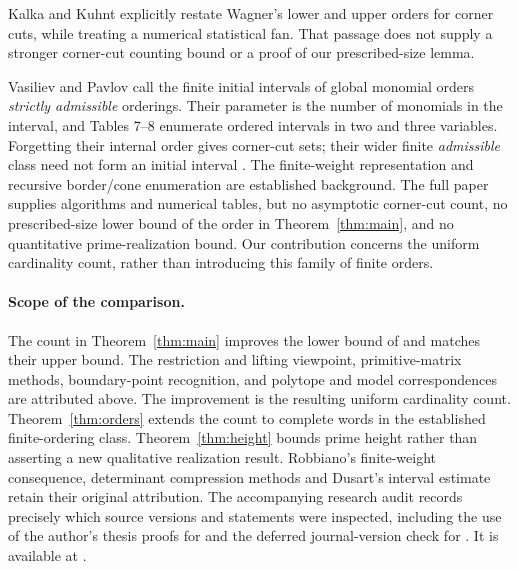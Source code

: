 \documentclass[11pt,a4paper]{article}
\theoremstyle{remark}
\begin{document}
Kalka and Kuhnt \cite[Section 2.2, p.~6]{KK} explicitly restate
Wagner's lower and upper orders for corner cuts, while treating a
numerical statistical fan. That passage does not supply a stronger
corner-cut counting bound or a proof of our prescribed-size lemma.

Vasiliev and Pavlov \cite[Definition 5 and Section 6]{VP}
call the finite initial intervals of global monomial orders
\emph{strictly admissible} orderings. Their parameter is the number of
monomials in the interval, and Tables 7--8 enumerate ordered intervals
in two and three variables. Forgetting their internal order gives
corner-cut sets; their wider finite \emph{admissible} class need not
form an initial interval \cite[Remark 1]{VP}.
The finite-weight representation and recursive border/cone enumeration
are established background. The full paper supplies algorithms and
numerical tables, but no asymptotic corner-cut count, no prescribed-size
lower bound of the order in Theorem~\ref{thm:main}, and no quantitative
prime-realization bound. Our contribution concerns the uniform
cardinality count, rather than introducing this family of finite orders.

\paragraph{Scope of the comparison.}
The count in Theorem~\ref{thm:main} improves the lower bound of
\cite{W02,W03} and matches their upper bound. The restriction and lifting
viewpoint, primitive-matrix methods, boundary-point recognition, and
polytope and model correspondences are attributed above. The improvement
is the resulting uniform cardinality count. Theorem~\ref{thm:orders}
extends the count to complete words in the established finite-ordering
class. Theorem~\ref{thm:height} bounds prime height rather than asserting
a new qualitative realization result. Robbiano's finite-weight
consequence, determinant compression methods and Dusart's interval
estimate retain their original attribution. The accompanying research
audit records precisely which source versions and statements were
inspected, including the use of the author's thesis proofs for
\cite{W02} and the deferred journal-version check for \cite{EGjournal}.
It is available at .
\end{document}
